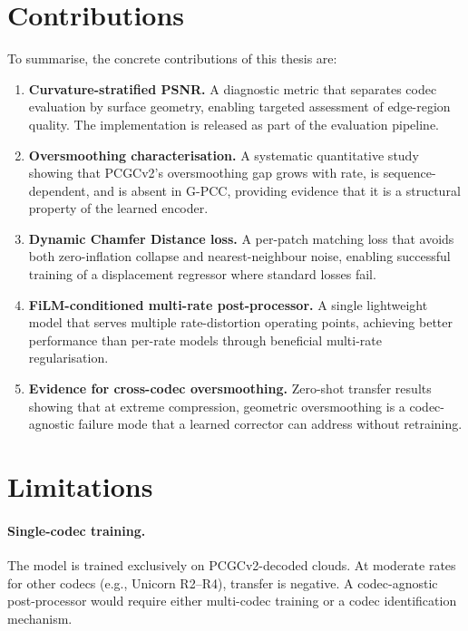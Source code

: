 \section{Contributions}

To summarise, the concrete contributions of this thesis are:

\begin{enumerate}
  \item \textbf{Curvature-stratified PSNR.}
    A diagnostic metric that separates codec evaluation by surface geometry,
    enabling targeted assessment of edge-region quality.
    The implementation is released as part of the evaluation pipeline.

  \item \textbf{Oversmoothing characterisation.}
    A systematic quantitative study showing that PCGCv2's oversmoothing gap
    grows with rate, is sequence-dependent, and is absent in G-PCC, providing
    evidence that it is a structural property of the learned encoder.

  \item \textbf{Dynamic Chamfer Distance loss.}
    A per-patch matching loss that avoids both zero-inflation collapse and
    nearest-neighbour noise, enabling successful training of a displacement
    regressor where standard losses fail.

  \item \textbf{FiLM-conditioned multi-rate post-processor.}
    A single lightweight model that serves multiple rate-distortion operating
    points, achieving better performance than per-rate models through
    beneficial multi-rate regularisation.

  \item \textbf{Evidence for cross-codec oversmoothing.}
    Zero-shot transfer results showing that at extreme compression, geometric
    oversmoothing is a codec-agnostic failure mode that a learned corrector
    can address without retraining.
\end{enumerate}

\section{Limitations}

\paragraph{Single-codec training.}
The model is trained exclusively on PCGCv2-decoded clouds.
At moderate rates for other codecs (e.g., Unicorn R2--R4), transfer is
negative.
A codec-agnostic post-processor would require either multi-codec training
or a codec identification mechanism.

